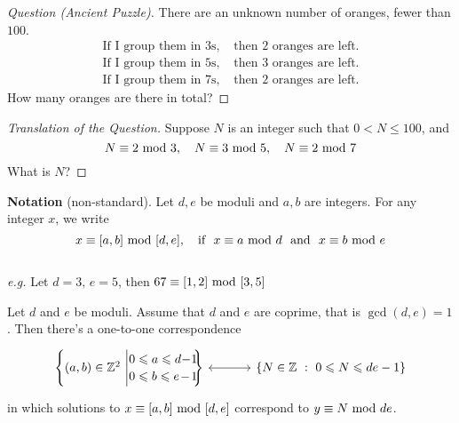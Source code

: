 \begin{proof}[Question (Ancient Puzzle)]\renewcommand{\qedsymbol}{}
There are an unknown number of oranges, fewer than $100$. 
\begin{align*}
\text{If I group them in $3$s,} & \text{ then $2$ oranges are left.}\\[0.2em]
\text{If I group them in $5$s,} & \text{ then $3$ oranges are left.}\\[0.2em]
\text{If I group them in $7$s,} & \text{ then $2$ oranges are left.}
\end{align*}
How many oranges are there in total?
\end{proof}

\begin{proof}[Translation of the Question]\renewcommand{\qedsymbol}{}
Suppose $N$ is an integer such that $0< N \leq 100$, and
\[N \equiv 2\text{ mod }{3},\quad N \equiv 3 \text{ mod }{5},\quad N \equiv 2 \text{ mod }{7}\]
What is $N$?
\end{proof}

\vspace*{1.5em}

{\bf Notation} (non-standard). Let $d,e$ be moduli and $a,b$ are integers. For any integer $x$, we write
\[x \equiv [a,b]\text{ mod }{[d,e]},\quad \text{if }\ x \equiv a \text{ mod }{d}\ \text{ and }\ x \equiv b \text{ mod }{e}\]\\[0.2em]
\emph{e.g.} Let $d = 3,\,e = 5$, then $67 \equiv [1,2]\text{ mod }{[3,5]}$


\begin{theorem}\label{crt}
Let $d$ and $e$ be moduli. Assume that $d$ and $e$ are coprime, that is $\gcd(d,e) = 1$. Then there's a one-to-one correspondence
\[\begin{tikzcd}
\set{(a,b) \in \zz^2\ \Bigg\vert \begin{minipage}{0.16\textwidth}
\begin{center}
$0 \leq a \leq d-1$\\[0.2em] $0 \leq b \leq e-1$
\end{center}
\end{minipage}\!\!}
 \arrow[r,leftrightarrow] &[1em] \setp{N \in \zz}{0\leq N \leq de-1}
\end{tikzcd}\]
in which solutions to $x \equiv [a,b]\text{ mod }{[d,e]}$ correspond to $y \equiv N\text{ mod }{de}$.
\end{theorem}

\vspace*{0.5em}

